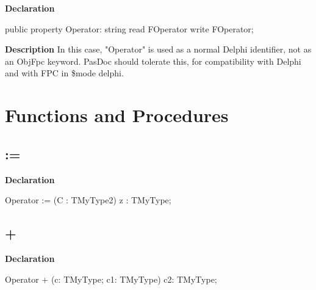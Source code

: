 \documentclass{report}
\begin{document}
\begin{list}{}{
\setlength{\itemindent}{0cm}
\setlength{\listparindent}{0cm}
\setlength{\leftmargin}{\evensidemargin}
\addtolength{\leftmargin}{\tmplength}
\settowidth{\labelsep}{X}
\addtolength{\leftmargin}{\labelsep}
\setlength{\labelwidth}{\tmplength}
}
\begin{flushleft}
\item[\textbf{Declaration}\hfill]
\begin{ttfamily}
public property Operator: string read FOperator write FOperator;\end{ttfamily}


\end{flushleft}
\par
\item[\textbf{Description}]
In this case, "Operator" is used as a normal Delphi identifier, not as an ObjFpc keyword. PasDoc should tolerate this, for compatibility with Delphi and with FPC in {\$}mode delphi.

\end{list}
\section{Functions and Procedures}
\subsection*{:=}
\begin{list}{}{
\setlength{\itemindent}{0cm}
\setlength{\listparindent}{0cm}
\setlength{\leftmargin}{\evensidemargin}
\addtolength{\leftmargin}{\tmplength}
\settowidth{\labelsep}{X}
\addtolength{\leftmargin}{\labelsep}
\setlength{\labelwidth}{\tmplength}
}
\begin{flushleft}
\item[\textbf{Declaration}\hfill]
\begin{ttfamily}
Operator := (C : TMyType2) z : TMyType;\end{ttfamily}


\end{flushleft}
\end{list}
\subsection*{+}
\begin{list}{}{
\setlength{\itemindent}{0cm}
\setlength{\listparindent}{0cm}
\setlength{\leftmargin}{\evensidemargin}
\addtolength{\leftmargin}{\tmplength}
\settowidth{\labelsep}{X}
\addtolength{\leftmargin}{\labelsep}
\setlength{\labelwidth}{\tmplength}
}
\begin{flushleft}
\item[\textbf{Declaration}\hfill]
\begin{ttfamily}
Operator + (c: TMyType; c1: TMyType) c2: TMyType;\end{ttfamily}


\end{flushleft}
\end{list}
\end{document}
